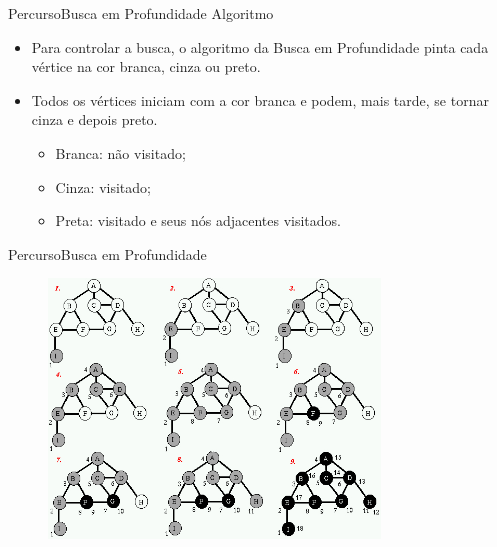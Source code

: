 \documentclass[aspectratio=169]{beamer}
\begin{document}

\begin{frame}{Percurso}{Busca em Profundidade}
Algoritmo
\begin{itemize}
\item Para controlar a busca, o algoritmo da Busca em Profundidade pinta cada vértice na cor branca, cinza ou preto.
\item Todos os vértices iniciam com a cor branca e podem, mais tarde, se tornar cinza e depois preto.
\begin{itemize}
\item Branca: não visitado;
\item Cinza: visitado;
\item Preta: visitado e seus nós adjacentes visitados.
\end{itemize}
\end{itemize}
\end{frame}


\begin{frame}{Percurso}{Busca em Profundidade}
\begin{figure}[!h]
  \centering
  \includegraphics[width=250pt]{imagens/depth_first_search.jpg}
  \label{fig_depth_first_search}
\end{figure}
\end{frame}

\end{document}
